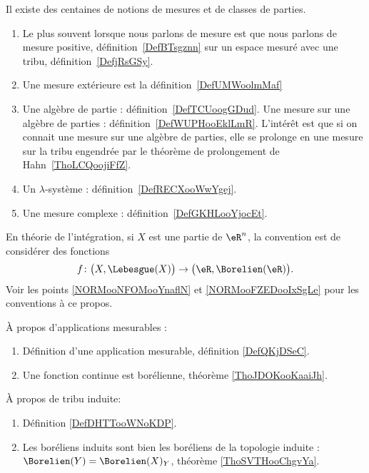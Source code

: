 

  \label{INTooVDSCooHXLLKp}
Il existe des centaines de notions de mesures et de classes de parties.
\begin{enumerate}
	\item
	      Le plus souvent lorsque nous parlons de mesure est que nous parlons de mesure positive, définition~\ref{DefBTsgznn} sur un espace mesuré avec une tribu, définition~\ref{DefjRsGSy}.
	\item
	      Une mesure extérieure est la définition~\ref{DefUMWoolmMaf}
	\item
	      Une algèbre de partie : définition~\ref{DefTCUoogGDud}. Une mesure sur une algèbre de parties : définition~\ref{DefWUPHooEklLmR}. L'intérêt est que si on connait une mesure sur une algèbre de parties, elle se prolonge en une mesure sur la tribu engendrée par le théorème de prolongement de Hahn~\ref{ThoLCQoojiFfZ}.
	\item
	      Un \( \lambda\)-système : définition~\ref{DefRECXooWwYgej}.
	\item
	      Une mesure complexe : définition~\ref{DefGKHLooYjocEt}.
\end{enumerate}

En théorie de l'intégration, si \( X\) est une partie de \( \eR^n\), la convention est de considérer des fonctions
\begin{equation*}
	f\colon \big( X,\Lebesgue(X) \big)\to \big( \eR,\Borelien(\eR) \big).
\end{equation*}
Voir les points \ref{NORMooNFOMooYnaflN} et \ref{NORMooFZEDooIxSgLe} pour les conventions à ce propos.

À propos d'applications mesurables :
\begin{enumerate}
	\item
	      Définition d'une application mesurable, définition \ref{DefQKjDSeC}.
	\item
	      Une fonction continue est borélienne, théorème \ref{ThoJDOKooKaaiJh}.
\end{enumerate}


À propos de tribu induite:
\begin{enumerate}
	\item
	      Définition \ref{DefDHTTooWNoKDP}.
	\item
	      Les boréliens induits sont bien les boréliens de la topologie induite : \( \Borelien(Y)=\Borelien(X)_Y\), théorème \ref{ThoSVTHooChgvYa}.
\end{enumerate}
